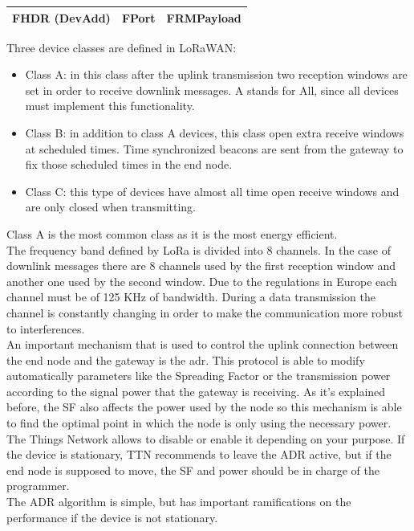 \begin{center}
\begin{tabular}{ |c|c|c| } 
    \hline
    FHDR (DevAdd) & FPort & FRMPayload \\ 
    \hline
\end{tabular}
\end{center}

Three device classes are defined in LoRaWAN:
\begin{itemize}
    \item Class A: in this class after the uplink transmission two reception
windows are set in order to receive downlink messages. A stands
for All, since all devices must implement this functionality.
    \item Class B: in addition to class A devices, this class open extra
receive windows at scheduled times. Time synchronized beacons
are sent from the gateway to fix those scheduled times in the end
node.
    \item Class C: this type of devices have almost all time open receive
windows and are only closed when transmitting.
\end{itemize}
Class A is the most common class as it is the most energy efficient.\\
The frequency band defined by LoRa is divided into 8 channels. In the
case of downlink messages there are 8 channels used by the first
reception window and another one used by the second window. Due to
the regulations in Europe each channel must be of 125 KHz of
bandwidth. During a data transmission the channel is constantly
changing in order to make the communication more robust to
interferences.\\
An important mechanism that is used to control the uplink connection
between the end node and the gateway is the \acrfull{adr}. This protocol is able to modify automatically parameters like the
Spreading Factor or the transmission power according to the signal
power that the gateway is receiving. As it's explained before, the SF also
affects the power used by the node so this mechanism is able to find the
optimal point in which the node is only using the necessary power. The
Things Network allows to disable or enable it depending on your
purpose. If the device is stationary, TTN recommends to leave the ADR
active, but if the end node is supposed to move, the SF and power
should be in charge of the programmer.\\
The ADR algorithm is simple, but has important ramifications on 
the performance if the device is not stationary.
